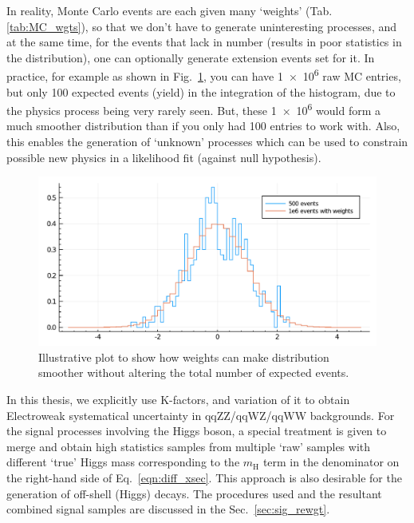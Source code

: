 In reality, Monte Carlo events are each given many `weights' (Tab. \ref{tab:MC_wgts}), so that
we don't have to generate uninteresting processes, and at the same time, for the events that lack
in number (results in poor statistics in the distribution), one can optionally generate
extension events set for it. In practice, for example as shown in Fig.~\ref{fig:wgt_demo}, 
you can have \num{1e6} raw MC entries, but only
100 expected events (yield) in the integration of the histogram, 
due to the physics process being very rarely seen. But,
these \num{1e6} would form a much smoother distribution than if you only had 100 entries to work with.
Also, this enables the generation of `unknown' processes which can
be used to constrain possible new physics in a likelihood fit (against null hypothesis).

\begin{figure}[hb]
\begin{center}
\includegraphics[width=.8\linewidth]{fig/demo_wgts.pdf}
\end{center}
\caption{Illustrative plot to show how weights can make distribution smoother without altering
the total number of expected events.}
\label{fig:wgt_demo}
\end{figure}

In this thesis, we explicitly use K-factors, and variation of it to 
obtain Electroweak systematical uncertainty in qqZZ/qqWZ/qqWW backgrounds. For the signal processes involving
the Higgs boson, a special treatment is given to merge and obtain high statistics samples from
multiple `raw' samples with different `true' Higgs mass corresponding to the $m_\mathrm{H}$ term
in the denominator on the right-hand side of Eq.~\ref{eqn:diff_xsec}.
This approach is also desirable for the generation of off-shell (Higgs) decays. The procedures 
used and the resultant combined signal samples are discussed in the Sec.~\ref{sec:sig_rewgt}.

